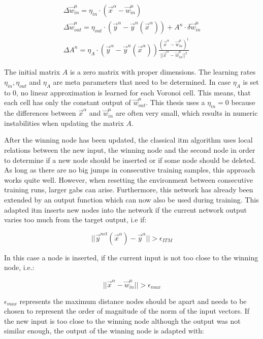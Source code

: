 \begin{equation}
\begin{split}
\Delta \vec{w}^n_{in} = \eta_{in} \cdot (\vec{x}^\alpha - \vec{w}^n_{in}) \\
\Delta \vec{w}^n_{out} = \eta_{out} \cdot (\vec{y}^\alpha - \vec{y}^n(\vec{x}^\alpha)) + A^n \cdot \delta \vec{w}^n_{in} \\
\Delta A^n = \eta_A \cdot (\vec{y}^\alpha - \vec{y}^n(\vec{x}^\alpha)) \frac{(\vec{x}^\alpha - \vec{w}^n_{in})^t}{||\vec{x}^\alpha - \vec{w}^n_{in}||^2}
\end{split}
\end{equation}

The initial matrix $A$ is a zero matrix with proper dimensions. The learning rates $\eta_{in}, \eta_{out}$ and $\eta_A$ are meta parameters that need to be determined. In case $\eta_A$ is set to 0, no linear approximation is learned for each Voronoi cell. This means, that each cell has only the constant output of $\vec{w}^n_{out}$. This thesis uses a $\eta_{in} = 0$ because the differences between $\vec{x}^\alpha$ and  $\vec{w}^n_{in}$ are often very small, which results in numeric instabilities when updating the matrix $A$.

After the winning node has been updated, the classical \gls{itm} algorithm uses local relations between the new input, the winning node and the second node in order to determine if a new node should be inserted or if some node should be deleted. As long as there are no big jumps in consecutive training samples, this approach works quite well. However, when resetting the environment between consecutive training runs, larger gabs can arise. Furthermore, this network has already been extended by an output function which can now also be used during training. This adapted \gls{itm} inserts new nodes into the network if the current network output varies too much from the target output, i.e if:

\begin{equation}
||\vec{y}^{net}(\vec{x}^\alpha)-\vec{y}^\alpha|| > \epsilon_{ITM}
\end{equation}

In this case a node is inserted, if the current input is not too close to the winning node, i.e.:

\begin{equation}
||\vec{x}^\alpha - \vec{w}^n_{in}|| > \epsilon_{max}
\end{equation}

$\epsilon_{max}$ represents the maximum distance nodes should be apart and needs to be chosen to represent the order of magnitude of the norm of the input vectors.
If the new input is too close to the winning node although the output was not similar enough, the output of the winning node is adapted with:

